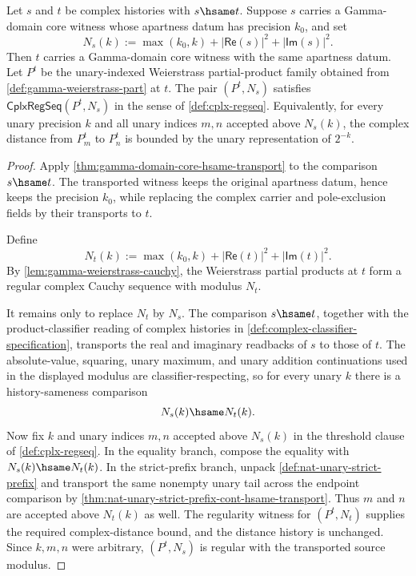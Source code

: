 \begin{theorem}
\label{thm:gamma-weierstrass-cauchy-modulus-hsame-transport}
Let $s$ and $t$ be complex histories with $s\hsame t$. Suppose $s$ carries a Gamma-domain core witness whose apartness datum has precision $k_0$, and set
$$
N_s(k):=\max(k_0,k)+|\mathsf{Re}(s)|^2+|\mathsf{Im}(s)|^2.
$$
Then $t$ carries a Gamma-domain core witness with the same apartness datum. Let $P^t$ be the unary-indexed Weierstrass partial-product family obtained from \autoref{def:gamma-weierstrass-part} at $t$. The pair $(P^t,N_s)$ satisfies $\mathsf{CplxRegSeq}(P^t,N_s)$ in the sense of \autoref{def:cplx-regseq}. Equivalently, for every unary precision $k$ and all unary indices $m,n$ accepted above $N_s(k)$, the complex distance from $P^t_m$ to $P^t_n$ is bounded by the unary representation of $2^{-k}$.
\end{theorem}
\begin{proof}
Apply \autoref{thm:gamma-domain-core-hsame-transport} to the comparison $s\hsame t$. The transported witness keeps the original apartness datum, hence keeps the precision $k_0$, while replacing the complex carrier and pole-exclusion fields by their transports to $t$.

Define
$$
N_t(k):=\max(k_0,k)+|\mathsf{Re}(t)|^2+|\mathsf{Im}(t)|^2.
$$
By \autoref{lem:gamma-weierstrass-cauchy}, the Weierstrass partial products at $t$ form a regular complex Cauchy sequence with modulus $N_t$.

It remains only to replace $N_t$ by $N_s$. The comparison $s\hsame t$, together with the product-classifier reading of complex histories in \autoref{def:complex-classifier-specification}, transports the real and imaginary readbacks of $s$ to those of $t$. The absolute-value, squaring, unary maximum, and unary addition continuations used in the displayed modulus are classifier-respecting, so for every unary $k$ there is a history-sameness comparison
$$
N_s(k)\hsame N_t(k).
$$
Now fix $k$ and unary indices $m,n$ accepted above $N_s(k)$ in the threshold clause of \autoref{def:cplx-regseq}. In the equality branch, compose the equality with $N_s(k)\hsame N_t(k)$. In the strict-prefix branch, unpack \autoref{def:nat-unary-strict-prefix} and transport the same nonempty unary tail across the endpoint comparison by \autoref{thm:nat-unary-strict-prefix-cont-hsame-transport}. Thus $m$ and $n$ are accepted above $N_t(k)$ as well. The regularity witness for $(P^t,N_t)$ supplies the required complex-distance bound, and the distance history is unchanged. Since $k,m,n$ were arbitrary, $(P^t,N_s)$ is regular with the transported source modulus.
\end{proof}

